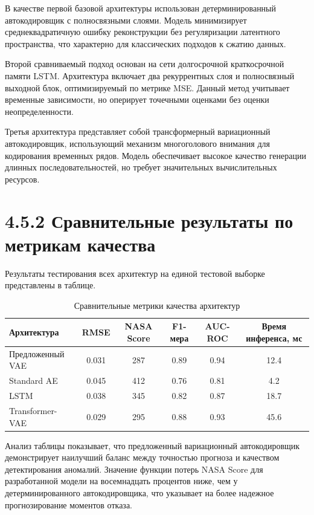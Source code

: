 \documentclass[14pt, a4paper, oneside]{extreport}
\begin{document}
В качестве первой базовой архитектуры использован детерминированный автокодировщик с полносвязными слоями. Модель минимизирует среднеквадратичную ошибку реконструкции без регуляризации латентного пространства, что характерно для классических подходов к сжатию данных.

Второй сравниваемый подход основан на сети долгосрочной краткосрочной памяти LSTM. Архитектура включает два рекуррентных слоя и полносвязный выходной блок, оптимизируемый по метрике MSE. Данный метод учитывает временные зависимости, но оперирует точечными оценками без оценки неопределенности.

Третья архитектура представляет собой трансформерный вариационный автокодировщик, использующий механизм многоголового внимания для кодирования временных рядов. Модель обеспечивает высокое качество генерации длинных последовательностей, но требует значительных вычислительных ресурсов.

\vspace{1em}
\section{4.5.2 Сравнительные результаты по метрикам качества}
\vspace{1em}

Результаты тестирования всех архитектур на единой тестовой выборке представлены в таблице.

\begin{table}[htbp]
\centering
\caption{Сравнительные метрики качества архитектур}
\label{tab:comparison_metrics}
\begin{tabular}{lccccc}
\hline
Архитектура & RMSE & NASA Score & F1-мера & AUC-ROC & Время инференса, мс \\
\hline
Предложенный VAE & 0.031 & 287 & 0.89 & 0.94 & 12.4 \\
Standard AE & 0.045 & 412 & 0.76 & 0.81 & 4.2 \\
LSTM & 0.038 & 345 & 0.82 & 0.87 & 18.7 \\
Transformer-VAE & 0.029 & 295 & 0.88 & 0.93 & 45.6 \\
\hline
\end{tabular}
\end{table}

Анализ таблицы показывает, что предложенный вариационный автокодировщик демонстрирует наилучший баланс между точностью прогноза и качеством детектирования аномалий. Значение функции потерь NASA Score для разработанной модели на восемнадцать процентов ниже, чем у детерминированного автокодировщика, что указывает на более надежное прогнозирование моментов отказа.
\end{document}
